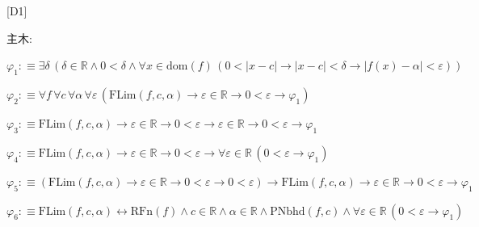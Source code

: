 \begin{fullproof}{[D1]}
\begin{ptree}
\end{ptree}
\noindent 主木:
\begin{ptree}
\noLine
{}
\end{ptree}
\begin{abbrevlist}
\item $\varphi_{1} :\equiv \exists \delta\,(\delta \in \mathbb{R} \land 0 < \delta \land \forall x \in \mathrm{dom}(f)\,(0 < \lvert x - c \rvert \to \lvert x - c \rvert < \delta \to \lvert f(x) - \alpha \rvert < \varepsilon))$
\item $\varphi_{2} :\equiv \forall f\,\forall c\,\forall \alpha\,\forall \varepsilon\,(\mathrm{FLim}(f,c,\alpha) \to \varepsilon \in \mathbb{R} \to 0 < \varepsilon \to \varphi_{1})$
\item $\varphi_{3} :\equiv \mathrm{FLim}(f,c,\alpha) \to \varepsilon \in \mathbb{R} \to 0 < \varepsilon \to \varepsilon \in \mathbb{R} \to 0 < \varepsilon \to \varphi_{1}$
\item $\varphi_{4} :\equiv \mathrm{FLim}(f,c,\alpha) \to \varepsilon \in \mathbb{R} \to 0 < \varepsilon \to \forall \varepsilon \in \mathbb{R}\,(0 < \varepsilon \to \varphi_{1})$
\item $\varphi_{5} :\equiv (\mathrm{FLim}(f,c,\alpha) \to \varepsilon \in \mathbb{R} \to 0 < \varepsilon \to 0 < \varepsilon) \to \mathrm{FLim}(f,c,\alpha) \to \varepsilon \in \mathbb{R} \to 0 < \varepsilon \to \varphi_{1}$
\item $\varphi_{6} :\equiv \mathrm{FLim}(f,c,\alpha) \leftrightarrow \mathrm{RFn}(f) \land c \in \mathbb{R} \land \alpha \in \mathbb{R} \land \mathrm{PNbhd}(f,c) \land \forall \varepsilon \in \mathbb{R}\,(0 < \varepsilon \to \varphi_{1})$
\end{abbrevlist}
\end{fullproof}
